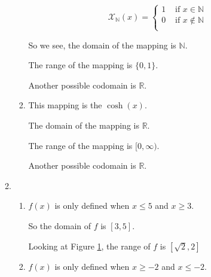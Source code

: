 \documentclass[12pt,letterpaper]{article}
\begin{document}
\begin{enumerate}
\begin{enumerate}
\begin{enumerate}
              \[
                \mathcal{X}_\mathbb{N}(x)
                =
                \begin{cases}
                  1 & \text{ if } x \in \mathbb{N} \\
                  0 & \text{ if } x \notin \mathbb{N} \\
                \end{cases}
              \]

              So we see,
              the domain of the mapping is $\mathbb{N}$.

              The range of the mapping is $\{0, 1\}$.

              Another possible codomain is $\mathbb{R}$.
            \item
              This mapping is the $\cosh(x)$.

              The domain of the mapping is $\mathbb{R}$.

              The range of the mapping is $[0, \infty)$.

              Another possible codomain is $\mathbb{R}$.
          \end{enumerate}
        \item
          \begin{enumerate}
            \begin{figure}
              \centering
              \begin{minipage}{.5\textwidth}
                \label{fig:a}
              \end{minipage}%
            \end{figure}

            \setcounter{enumiii}{4}
            \item
              $f(x)$ is only defined when $x \leq 5$ and $x \geq 3$.

              So the domain of $f$ is $[3, 5]$.

              Looking at Figure \ref{fig:a},
              the range of $f$ is $[\sqrt{2}, 2]$
            \item
              $f(x)$ is only defined when $x \geq -2$ and $x \leq -2$.


\end{enumerate}
\end{enumerate}
\end{enumerate}
\end{document}

